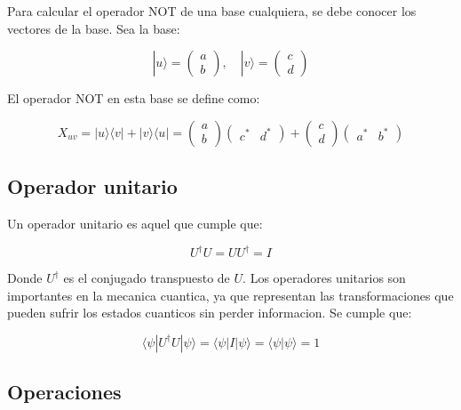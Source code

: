 \documentclass[11pt]{article}
\begin{document}
Para calcular el operador NOT de una base cualquiera, se debe conocer los vectores de la base. Sea la base:

\begin{equation}
    |u\rangle = \begin{pmatrix} a \\ b \end{pmatrix}, \quad |v\rangle = \begin{pmatrix} c \\ d \end{pmatrix}
\end{equation}

El operador NOT en esta base se define como:

\begin{equation}
    X_{uv} = |u\rangle \langle v| + |v\rangle \langle u| = \begin{pmatrix} a \\ b \end{pmatrix} \begin{pmatrix} c^* & d^* \end{pmatrix} + \begin{pmatrix} c \\ d \end{pmatrix} \begin{pmatrix} a^* & b^* \end{pmatrix}
\end{equation}

\subsection{Operador unitario}

Un operador unitario es aquel que cumple que:

\begin{equation}
    U^\dagger U = U U^\dagger = I
\end{equation}

Donde $U^\dagger$ es el conjugado transpuesto de $U$. Los operadores unitarios son importantes en la mecanica cuantica, ya que representan las transformaciones que pueden sufrir los estados cuanticos sin perder informacion. Se cumple que:

\begin{equation}
    \langle \psi | U^\dagger U | \psi \rangle = \langle \psi | I | \psi \rangle = \langle \psi | \psi \rangle = 1
\end{equation}

\subsection{Operaciones}
\end{document}

